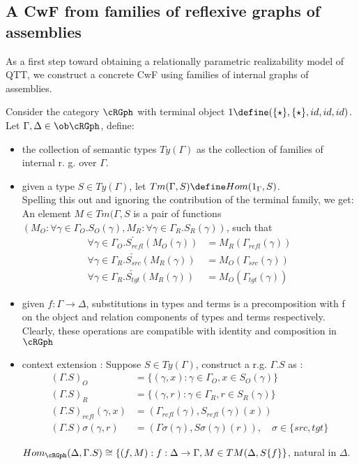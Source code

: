 \documentclass[12pt,a4paper]{article}
\def\src{_{src}}\alwaysmath{src}
\def\rfl{_{refl}}\alwaysmath{rfl}
\def\tgt{_{tgt}}\alwaysmath{tgt}
\renewcommand{\O}{_{O}}\alwaysmath{O}
\def\R{_{R}}\alwaysmath{R}
\begin{document}
\subsection*{A CwF from families of reflexive graphs of assemblies}
As a first step toward obtaining a relationally parametric realizability model of QTT, we construct a concrete CwF using families of internal graphs of assemblies.

Consider the category $\cRGph$ with terminal object $1 \define (\{\star\}, \{\star\}, id, id, id)$.\\
Let $\Gamma, \Delta \in \ob\cRGph$, define: 
\begin{itemize}[noitemsep]
  \item the collection of semantic types $Ty(\Gamma)$ as the collection of families of internal r. g. over $\Gamma$.
  
  \item given a type $S \in Ty(\Gamma)$, let $Tm(\Gamma, S) \define Hom(1_\Gamma, S)$.\\
  Spelling this out and ignoring the contribution of the terminal family, we get:\\
  An element $M \in Tm(\Gamma, S$ is a pair of functions $(M\O : \forall \gamma \in \Gamma\O. S\O(\gamma), M\R : \forall \gamma \in \Gamma\R. S\R(\gamma))$, such that 
  \begin{align*}
    \forall \gamma \in \Gamma\O.\check {S\rfl} (M\O(\gamma)) &= M\R(\Gamma\rfl(\gamma))\\
    \forall \gamma \in \Gamma\R.\check {S\src} (M\R(\gamma)) &= M\O(\Gamma\src(\gamma))\\
    \forall \gamma \in \Gamma\R.\check {S\tgt} (M\R(\gamma)) &= M\O(\Gamma\tgt(\gamma))
  \end{align*}
  
  \item given $f : \Gamma \to \Delta$, substitutions in types and terms is a precomposition with f on the object and relation components of types and terms respectively. Clearly, these operations are compatible with identity and composition in $\cRGph$
  
  \item context extension : Suppose $S \in Ty(\Gamma)$, construct a r.g. $\Gamma.S$ as :
  \begin{align*}
    (\Gamma.S)\O &= \{(\gamma, x) : \gamma \in \Gamma\O, x \in S\O(\gamma)\}\\
    (\Gamma.S)\R &= \{(\gamma, r) : \gamma \in \Gamma\R, r \in S\R(\gamma)\}\\
    (\Gamma.S)\rfl(\gamma, x) &= (\Gamma\rfl(\gamma), S\rfl(\gamma)(x))\\
    (\Gamma.S)\sigma(\gamma, r) &= (\Gamma\sigma(\gamma), S\sigma(\gamma)(r)),\quad \sigma \in \{src, tgt\}
  \end{align*}
  \begin{claim}
    $Hom_{\cRGph}(\Delta, \Gamma.S) \cong \{(f,M): f : \Delta \to \Gamma, M \in TM(\Delta, S\{f\}\}$, natural in $\Delta$.
  \end{claim}
\end{itemize}
\end{document}
